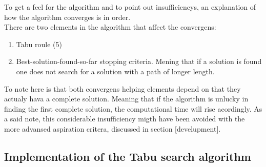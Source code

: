 \begin{enumerate}
To get a feel for the algorithm and to point out insufficiencys, an explanation of how the algorithm converges is in order.\\
There are two elements in the algorithm that affect the convergens:
\begin{enumerate}
\item{} Tabu roule (5)
\item{} Best-solution-found-so-far stopping criteria. 
\subitem{} Mening that if a solution is found one does not search for a solution with a path of longer length.
\end{enumerate}
To note here is that both convergens helping elements depend on that they actualy hava a complete solution. Meaning that if the algorithm is unlucky in finding the first complete solution, the computational time will rise acordingly. As a said note, this considerable insufficiency migth have been avoided with the more advansed aspiration critera, discussed in section [develupment].

\subsection{Implementation of the Tabu search algorithm}


\end{enumerate}
